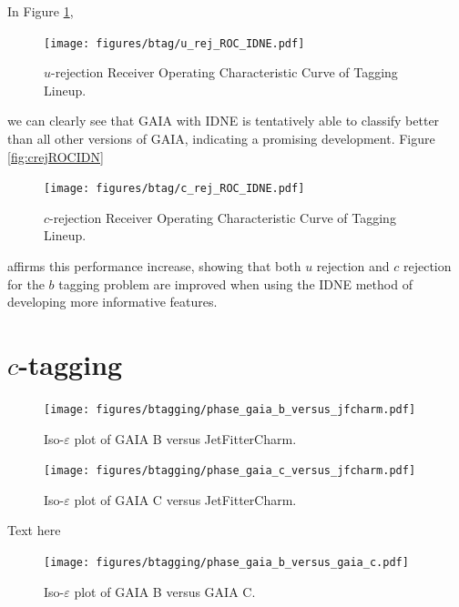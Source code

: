 In Figure \ref{fig:urejROCIDNE}, 

\begin{figure}
\texttt{[image: figures/btag/u\_rej\_ROC\_IDNE.pdf]}
\caption[The ATLAS detector]{$u$-rejection Receiver Operating Characteristic Curve of Tagging Lineup.
\label{fig:urejROCIDNE}}
\end{figure}

we can clearly see that GAIA with IDNE is tentatively able to classify better than all other versions of GAIA, indicating a promising development. Figure \ref{fig:crejROCIDN} 

\begin{figure}
\texttt{[image: figures/btag/c\_rej\_ROC\_IDNE.pdf]}
\caption[The ATLAS detector]{$c$-rejection Receiver Operating Characteristic Curve of Tagging Lineup.
\label{fig:crejROCIDNE}}
\end{figure}
affirms this performance increase, showing that both $u$ rejection and $c$ rejection for the $b$ tagging problem are improved when using the IDNE method of developing more informative features. 







\section{$c$-tagging}

\begin{figure}
\texttt{[image: figures/btagging/phase\_gaia\_b\_versus\_jfcharm.pdf]}
\caption[The ATLAS detector]{Iso-$\varepsilon$ plot of GAIA B versus JetFitterCharm.
\label{fig:gbjfcphase}}
\end{figure}

\begin{figure}
\texttt{[image: figures/btagging/phase\_gaia\_c\_versus\_jfcharm.pdf]}
\caption[The ATLAS detector]{Iso-$\varepsilon$ plot of GAIA C versus JetFitterCharm.
\label{fig:gcjfcphase}}
\end{figure}

Text here
\begin{figure}
\texttt{[image: figures/btagging/phase\_gaia\_b\_versus\_gaia\_c.pdf]}
\caption[The ATLAS detector]{Iso-$\varepsilon$ plot of GAIA B versus GAIA C.
\label{fig:gbgcphase}}
\end{figure}
















%







